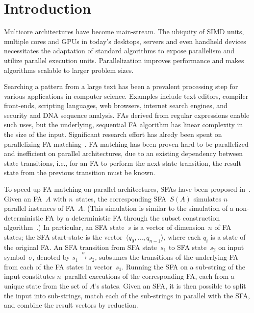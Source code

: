 \documentclass[10pt, conference, compsocconf]{IEEEtran}
\begin{document}
\IEEEpeerreviewmaketitle

\section{Introduction}
\label{sec:introduction}

Multicore architectures have 
become main-stream. The
ubiquity of SIMD units, multiple cores and GPUs in today's desktops,
servers and even handheld devices necessitates the adaptation of
standard algorithms to expose parallelism and utilize
parallel execution units. Parallelization improves performance 
and makes algorithms scalable to larger problem sizes.

Searching a pattern from a large text has been a prevalent processing
step for various applications in computer science. Examples include
text editors, compiler front-ends, scripting languages, web
browsers, internet search engines, and security and DNA sequence
analysis. FAs derived from regular expressions  enable
such
uses, but the underlying, sequential FA algorithm
has linear complexity in the size of the input.
Significant research effort has alredy been
spent on parallelizing FA matching~\cite{Ladner:1980,Hillis:1986,Misra:2003,ScarpazzaVP07,Holub:2009,Jones2009,Luchaup2009,WangHL10,Luchaup2011,Ko2014,Mytkowicz2014}.
FA matching has been proven hard to be parallelized and inefficient
on parallel architectures, due to an existing dependency between state
transitions, i.e., for an FA to perform the next state transition, the
result state from the previous transition must be known.

To speed up FA matching on parallel architectures, SFAs have been proposed
in~\cite{Sinya2013}.  Given an FA~$A$ with $n$~states, the corresponding
SFA~$S(A)$ simulates $n$ parallel instances of FA~$A$. (This simulation is
similar to the simulation of a non-deterministic FA by a deterministic FA
through the subset construction algorithm~\cite{HopcroftU79}.) In particular,
an SFA state~$s$ is a vector of dimension~$n$ of FA states; the SFA start-state
is the vector~$\langle q_0,\ldots,q_{n-1}\rangle$, where each $q_i$ is a state
of the original FA. An SFA transition from SFA state~$s_1$ to SFA state~$s_2$
on input symbol~$\sigma$, denoted by $s_1\overset{\sigma}{\rightarrow} s_2$,
subsumes the transitions of the underlying FA from each of the FA states in
vector~$s_1$. Running the SFA on a sub-string of the input constitutes
$n$~parallel executions of the corresponding FA, each from a unique state
from the set of $A$'s states.  Given an SFA, it is then possible to split the
input into sub-strings, match each of the sub-strings in parallel with the SFA,
and combine the result vectors by reduction.
\end{document}
